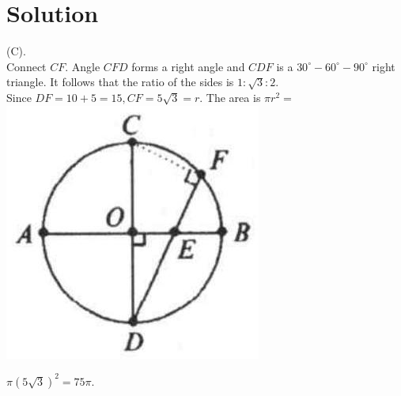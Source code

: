 \documentclass{article}
\begin{document}
\section*{Solution}
(C).\\
Connect \(C F\). Angle \(C F D\) forms a right angle and \(C D F\) is a \(30^{\circ}-60^{\circ}-90^{\circ}\) right triangle. It follows that the ratio of the sides is \(1: \sqrt{3}: 2\).\\
Since \(D F=10+5=15, C F=5 \sqrt{3}=r\). The area is \(\pi r^{2}=\)\\
\centering
\includegraphics[width=\textwidth]{images/173(2).jpg}


\(\pi(5 \sqrt{3})^{2}=75 \pi\).
\end{document}
